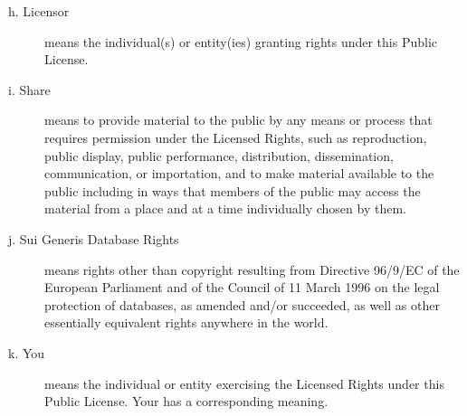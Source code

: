 \begin{description}
\item[h. Licensor] means the individual(s) or entity(ies) granting rights under this Public License.

\item[i. Share] means to provide material to the public by any means or process that requires permission under the Licensed Rights, such as reproduction, public display, public performance, distribution, dissemination, communication, or importation, and to make material available to the public including in ways that members of the public may access the material from a place and at a time individually chosen by them.

\item[j. Sui Generis Database Rights] means rights other than copyright resulting from Directive 96/9/EC of the European Parliament and of the Council of 11 March 1996 on the legal protection of databases, as amended and/or succeeded, as well as other essentially equivalent rights anywhere in the world.

\item[k. You] means the individual or entity exercising the Licensed Rights under this Public License. Your has a corresponding meaning.
\end{description}

